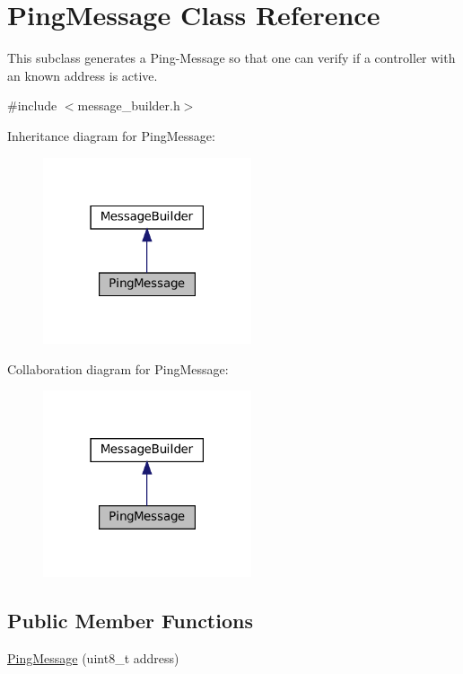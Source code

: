 \hypertarget{classPingMessage}{}\section{Ping\+Message Class Reference}
\label{classPingMessage}


This subclass generates a Ping-\/\+Message so that one can verify if a controller with an known address is active.  




{\ttfamily \#include $<$message\+\_\+builder.\+h$>$}



Inheritance diagram for Ping\+Message\+:\nopagebreak
\begin{figure}[H]
\begin{center}
\leavevmode
\includegraphics[width=174pt]{classPingMessage__inherit__graph}
\end{center}
\end{figure}


Collaboration diagram for Ping\+Message\+:\nopagebreak
\begin{figure}[H]
\begin{center}
\leavevmode
\includegraphics[width=174pt]{classPingMessage__coll__graph}
\end{center}
\end{figure}
\subsection*{Public Member Functions}
\begin{DoxyCompactItemize}
\item 
\hyperlink{classPingMessage_a67d49a8189b481cf1d39460a90ab5be7}{Ping\+Message} (uint8\+\_\+t address)
\end{DoxyCompactItemize}
